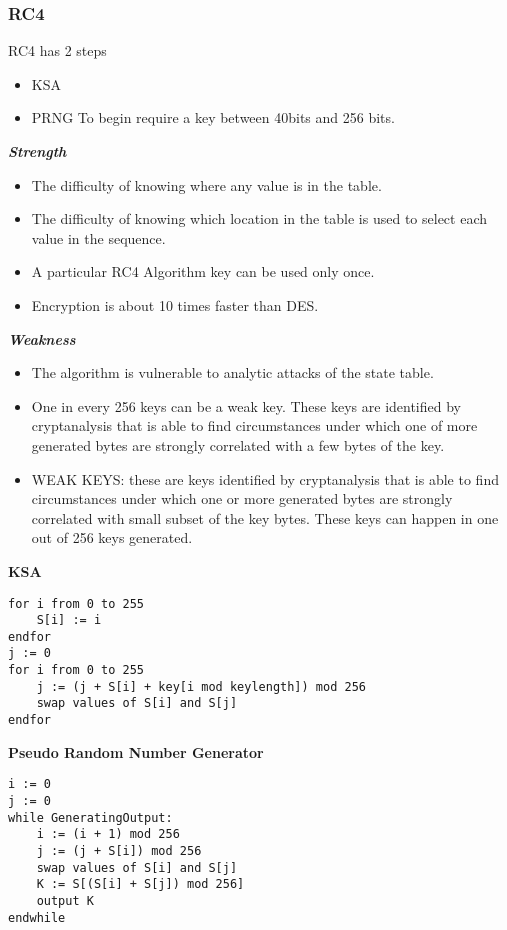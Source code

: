 \documentclass[12pt]{article}
\begin{document}
{\begin{verbatim}
\end{verbatim}
\subsubsection{RC4}
RC4 has 2 steps \\
\begin{itemize}
\item KSA
\item PRNG
To begin require a key between 40bits and 256 bits.\\
\end{itemize}
\textbf{\textit {Strength}}\\
\begin{itemize}
\item The difficulty of knowing where any value is in the table. 
\item The difficulty of knowing which location in the table is used to select each value in the sequence. 
\item A particular RC4 Algorithm key can be used only once. 
\item Encryption is about 10 times faster than DES. 
\end{itemize}
\textbf{\textit {Weakness}}\\

\begin{itemize}
\item The algorithm is vulnerable to analytic attacks of the state table. 
\item One in every 256 keys can be a weak key. These keys are identified by cryptanalysis that is able to find circumstances under which one of more generated bytes are strongly correlated with a few bytes of the key.
\item WEAK KEYS: these are keys identified by cryptanalysis that is able to find circumstances under which one or more generated bytes are strongly correlated with small subset of the key bytes. These keys can happen in one out of 256 keys generated.\\
\end{itemize}
\textbf{KSA}\\
\begin{verbatim}
for i from 0 to 255
    S[i] := i
endfor
j := 0
for i from 0 to 255
    j := (j + S[i] + key[i mod keylength]) mod 256
    swap values of S[i] and S[j]
endfor
\end{verbatim}
\textbf{Pseudo Random Number Generator}\\
\begin{verbatim}
i := 0
j := 0
while GeneratingOutput:
    i := (i + 1) mod 256
    j := (j + S[i]) mod 256
    swap values of S[i] and S[j]
    K := S[(S[i] + S[j]) mod 256]
    output K
endwhile
\end{verbatim}

}
\end{document}
